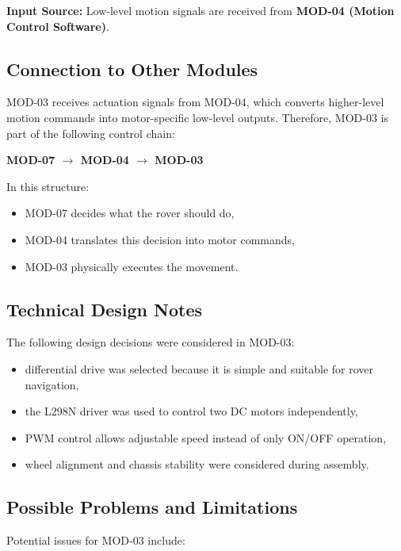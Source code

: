 \documentclass[12pt,a4paper]{article}
\begin{document}
\textbf{Input Source:}  
Low-level motion signals are received from \textbf{MOD-04 (Motion Control Software)}.

\subsection{Connection to Other Modules}

MOD-03 receives actuation signals from MOD-04, which converts higher-level motion commands into motor-specific low-level outputs. Therefore, MOD-03 is part of the following control chain:

\begin{center}
\textbf{MOD-07 $\rightarrow$ MOD-04 $\rightarrow$ MOD-03}
\end{center}

In this structure:

\begin{itemize}[leftmargin=1.2cm]
    \item MOD-07 decides what the rover should do,
    \item MOD-04 translates this decision into motor commands,
    \item MOD-03 physically executes the movement.
\end{itemize}

\subsection{Technical Design Notes}

The following design decisions were considered in MOD-03:

\begin{itemize}[leftmargin=1.2cm]
    \item differential drive was selected because it is simple and suitable for rover navigation,
    \item the L298N driver was used to control two DC motors independently,
    \item PWM control allows adjustable speed instead of only ON/OFF operation,
    \item wheel alignment and chassis stability were considered during assembly.
\end{itemize}

\subsection{Possible Problems and Limitations}

Potential issues for MOD-03 include:
\end{document}

